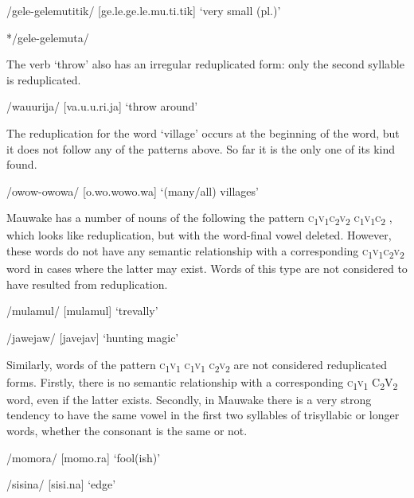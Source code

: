 /gele-gelemutitik/  [ge.{{\textprimstress}}le.ge.{{\textprimstress}}{{\textprimstress}}le.mu.ti.tik]  `very small (pl.)'

*/gele-gelemuta/

The verb  `throw' also has an irregular reduplicated form: only the second syllable is reduplicated.

/wa{\textphi}u{\textphi}urija/  [va.{{\textprimstress}}{\textphi}u.{\textphi}u.ri.ja]  `throw around'

The reduplication for the word  `village' occurs at the beginning of the word, but it does not follow any of the patterns above. So far it is the only one of its kind found.

/owow-owowa/  [o.{{\textprimstress}}wo.wo{{\textprimstress}}{{\textprimstress}}wo.wa]  `(many/all) villages'

Mauwake has a number of nouns of the following the pattern \textsc{c}\textsubscript{1}\textsc{v}\textsubscript{1}\textsc{c}\textsubscript{2}\textsc{v}\textsubscript{2} \textsc{c}\textsubscript{1}\textsc{v}\textsubscript{1}\textsc{c}\textsubscript{2} , which looks like reduplication, but with the word-final vowel deleted.  However, these words do not have any semantic relationship with a corresponding \textsc{c}\textsubscript{1}\textsc{v}\textsubscript{1}\textsc{c}\textsubscript{2}\textsc{v}\textsubscript{2} word in cases where the latter may exist.  Words of this type are not considered to have resulted from reduplication.

/mulamul/  [mu{{\textprimstress}lamul}]  `trevally'

/jawejaw/  [ja{{\textprimstress}vejav}]  `hunting magic'

Similarly, words of the pattern \textsc{c}\textsubscript{1}\textsc{v}\textsubscript{1} \textsc{c}\textsubscript{1}\textsc{v}\textsubscript{1} \textsc{c}\textsubscript{2}\textsc{v}\textsubscript{2} are not considered reduplicated forms.  Firstly, there is no semantic relationship with a corresponding \textsc{c}\textsubscript{1}\textsc{v}\textsubscript{1} C\textsubscript{2}V\textsubscript{2} word, even if the latter exists. Secondly, in Mauwake there is a very strong tendency to have the same vowel in the first two syllables of trisyllabic or longer words, whether the consonant is the same or not. 

/momora/  [mo{{\textprimstress}mo.ra}]  `fool(ish)'

/sisina/  [si{{\textprimstress}si.na}]  `edge'

